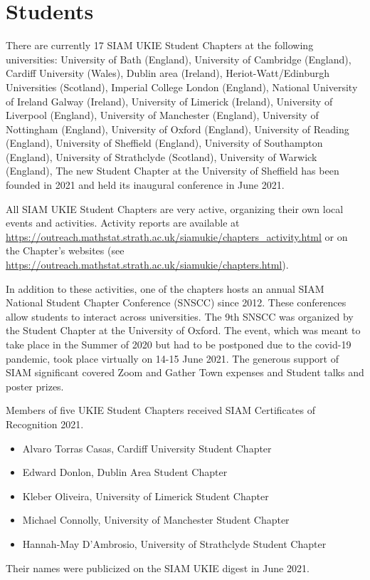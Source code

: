 \documentclass{article}
\begin{document}
\section*{Students}

There are currently 17 SIAM UKIE Student Chapters at the following universities: 
University of Bath (England), 
University of Cambridge (England), 
Cardiff University (Wales), 
Dublin area (Ireland), 
Heriot-Watt/Edinburgh Universities (Scotland), 
Imperial College London (England), 
National University of Ireland Galway (Ireland), 
University of Limerick (Ireland), 
University of Liverpool (England), 
University of Manchester (England), 
University of Nottingham (England), 
University of Oxford (England), 
University of Reading (England), 
University of Sheffield (England), 
University of Southampton (England), 
University of Strathclyde (Scotland), 
University of Warwick (England), 
The new Student Chapter at the University of Sheffield has been founded in 2021 and held its
inaugural conference in June 2021.

All SIAM UKIE Student Chapters are very active, organizing their own local events and activities. 
Activity reports are available at \url{https://outreach.mathstat.strath.ac.uk/siamukie/chapters_activity.html} 
or on the Chapter's websites (see \url{https://outreach.mathstat.strath.ac.uk/siamukie/chapters.html}).

In addition to these activities, one of the chapters hosts an annual SIAM National Student Chapter
Conference (SNSCC) since 2012. These conferences allow students to interact across universities. The
9th SNSCC was organized by the Student Chapter at the University of Oxford. The event, which was meant to take 
place in the Summer of 2020 but had to be postponed due to the covid-19 pandemic, took place virtually 
on 14-15 June 2021. 
The generous support of SIAM significant covered Zoom and Gather Town expenses and Student talks and poster prizes. 


Members of five UKIE Student Chapters received SIAM Certificates of Recognition 2021. 
\begin{itemize}
\item Alvaro Torras Casas, Cardiff University Student Chapter
\item Edward Donlon, Dublin Area Student Chapter 
\item Kleber Oliveira, University of Limerick Student Chapter 
\item Michael Connolly, University of Manchester Student Chapter 
\item Hannah-May D'Ambrosio, University of Strathclyde Student Chapter
\end{itemize}
Their names were publicized on the SIAM UKIE digest in June 2021.
\end{document}
